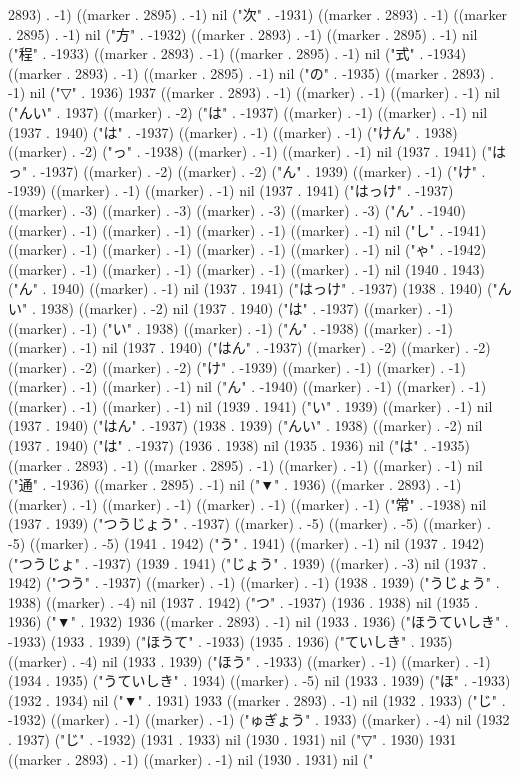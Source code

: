 2893) . -1) ((marker . 2895) . -1) nil ("次" . -1931) ((marker . 2893) . -1) ((marker . 2895) . -1) nil ("方" . -1932) ((marker . 2893) . -1) ((marker . 2895) . -1) nil ("程" . -1933) ((marker . 2893) . -1) ((marker . 2895) . -1) nil ("式" . -1934) ((marker . 2893) . -1) ((marker . 2895) . -1) nil ("の" . -1935) ((marker . 2893) . -1) nil ("▽" . 1936) 1937 ((marker . 2893) . -1) ((marker) . -1) ((marker) . -1) nil ("んい" . 1937) ((marker) . -2) ("は" . -1937) ((marker) . -1) ((marker) . -1) nil (1937 . 1940) ("は" . -1937) ((marker) . -1) ((marker) . -1) ("けん" . 1938) ((marker) . -2) ("っ" . -1938) ((marker) . -1) ((marker) . -1) nil (1937 . 1941) ("はっ" . -1937) ((marker) . -2) ((marker) . -2) ("ん" . 1939) ((marker) . -1) ("け" . -1939) ((marker) . -1) ((marker) . -1) nil (1937 . 1941) ("はっけ" . -1937) ((marker) . -3) ((marker) . -3) ((marker) . -3) ((marker) . -3) ("ん" . -1940) ((marker) . -1) ((marker) . -1) ((marker) . -1) ((marker) . -1) nil ("し" . -1941) ((marker) . -1) ((marker) . -1) ((marker) . -1) ((marker) . -1) nil ("ゃ" . -1942) ((marker) . -1) ((marker) . -1) ((marker) . -1) ((marker) . -1) nil (1940 . 1943) ("ん" . 1940) ((marker) . -1) nil (1937 . 1941) ("はっけ" . -1937) (1938 . 1940) ("んい" . 1938) ((marker) . -2) nil (1937 . 1940) ("は" . -1937) ((marker) . -1) ((marker) . -1) ("い" . 1938) ((marker) . -1) ("ん" . -1938) ((marker) . -1) ((marker) . -1) nil (1937 . 1940) ("はん" . -1937) ((marker) . -2) ((marker) . -2) ((marker) . -2) ((marker) . -2) ("け" . -1939) ((marker) . -1) ((marker) . -1) ((marker) . -1) ((marker) . -1) nil ("ん" . -1940) ((marker) . -1) ((marker) . -1) ((marker) . -1) ((marker) . -1) nil (1939 . 1941) ("い" . 1939) ((marker) . -1) nil (1937 . 1940) ("はん" . -1937) (1938 . 1939) ("んい" . 1938) ((marker) . -2) nil (1937 . 1940) ("は" . -1937) (1936 . 1938) nil (1935 . 1936) nil ("は" . -1935) ((marker . 2893) . -1) ((marker . 2895) . -1) ((marker) . -1) ((marker) . -1) nil ("通" . -1936) ((marker . 2895) . -1) nil ("▼" . 1936) ((marker . 2893) . -1) ((marker) . -1) ((marker) . -1) ((marker) . -1) ((marker) . -1) ("常" . -1938) nil (1937 . 1939) ("つうじょう" . -1937) ((marker) . -5) ((marker) . -5) ((marker) . -5) ((marker) . -5) (1941 . 1942) ("う" . 1941) ((marker) . -1) nil (1937 . 1942) ("つうじょ" . -1937) (1939 . 1941) ("じょう" . 1939) ((marker) . -3) nil (1937 . 1942) ("つう" . -1937) ((marker) . -1) ((marker) . -1) (1938 . 1939) ("うじょう" . 1938) ((marker) . -4) nil (1937 . 1942) ("つ" . -1937) (1936 . 1938) nil (1935 . 1936) ("▼" . 1932) 1936 ((marker . 2893) . -1) nil (1933 . 1936) ("ほうていしき" . -1933) (1933 . 1939) ("ほうて" . -1933) (1935 . 1936) ("ていしき" . 1935) ((marker) . -4) nil (1933 . 1939) ("ほう" . -1933) ((marker) . -1) ((marker) . -1) (1934 . 1935) ("うていしき" . 1934) ((marker) . -5) nil (1933 . 1939) ("ほ" . -1933) (1932 . 1934) nil ("▼" . 1931) 1933 ((marker . 2893) . -1) nil (1932 . 1933) ("じ" . -1932) ((marker) . -1) ((marker) . -1) ("ゅぎょう" . 1933) ((marker) . -4) nil (1932 . 1937) ("じ" . -1932) (1931 . 1933) nil (1930 . 1931) nil ("▽" . 1930) 1931 ((marker . 2893) . -1) ((marker) . -1) nil (1930 . 1931) nil ("
